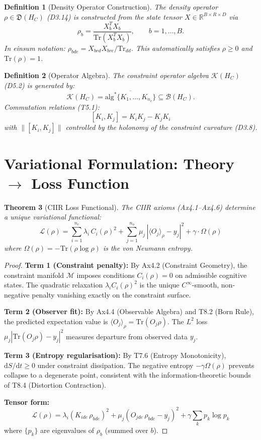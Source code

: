 \documentclass[11pt,a4paper]{article}
\newtheorem{definition}{Definition}[section]
\newtheorem{theorem}[definition]{Theorem}
\newcommand{\CM}{\mathcal{M}}
\newcommand{\HC}{H_C}
\newcommand{\CB}{\mathcal{B}}
\newcommand{\CK}{\mathcal{K}}
\newcommand{\CL}{\mathcal{L}}
\newcommand{\Tr}{\mathrm{Tr}}
\begin{document}
\begin{definition}[Density Operator Construction]
\label{def:density}
The density operator $\rho \in \mathfrak{D}(\HC)$ (D3.14) is
constructed from the state tensor $X \in \mathbb{R}^{B \times R
\times D}$ via
\[
  \rho_b = \frac{X_b^T X_b}{\Tr(X_b^T X_b)},
  \qquad b = 1, \ldots, B.
\]
In einsum notation: $\rho_{bde} = X_{brd} X_{bre} / \Tr_{dd}$.
This automatically satisfies $\rho \geq 0$ and $\Tr(\rho) = 1$.
\end{definition}

\begin{definition}[Operator Algebra]
\label{def:operator-algebra}
The constraint operator algebra $\CK(\HC)$ (D5.2) is generated by:
\[
  \CK(\HC) = \overline{\mathrm{alg}^*\{K_1, \ldots, K_{n_c}\}}
  \subseteq \CB(\HC).
\]
Commutation relations (T5.1):
\[
  [K_i, K_j] = K_i K_j - K_j K_i
\]
with $\|[K_i, K_j]\|$ controlled by the holonomy of the constraint
curvature (D3.8).
\end{definition}

\section{Variational Formulation: Theory $\to$ Loss Function}
\label{sec:loss}

\begin{theorem}[CIIR Loss Functional]
\label{thm:loss}
The CIIR axioms (Ax4.1--Ax4.6) determine a unique variational
functional:
\[
  \CL(\rho) = \sum_{i=1}^{n_c} \lambda_i\, C_i(\rho)^2
    + \sum_{j=1}^{n_o} \mu_j\, |\langle O_j \rangle_\rho - y_j|^2
    + \gamma \cdot \Omega(\rho)
\]
where $\Omega(\rho) = -\Tr(\rho \log \rho)$ is the von Neumann entropy.
\end{theorem}

\begin{proof}
\textbf{Term 1 (Constraint penalty):}
By Ax4.2 (Constraint Geometry), the constraint manifold $\CM$ imposes
conditions $C_i(\rho) = 0$ on admissible cognitive states.  The
quadratic relaxation $\lambda_i C_i(\rho)^2$ is the unique
$C^\infty$-smooth, non-negative penalty vanishing exactly on the
constraint surface.

\textbf{Term 2 (Observer fit):}
By Ax4.4 (Observable Algebra) and T8.2 (Born Rule), the predicted
expectation value is $\langle O_j \rangle_\rho = \Tr(O_j \rho)$.
The $L^2$ loss $\mu_j |\Tr(O_j \rho) - y_j|^2$ measures departure
from observed data $y_j$.

\textbf{Term 3 (Entropy regularisation):}
By T7.6 (Entropy Monotonicity), $\mathrm{d}S/\mathrm{d}t \geq 0$
under constraint dissipation.  The negative entropy $-\gamma
\Omega(\rho)$ prevents collapse to a degenerate point, consistent
with the information-theoretic bounds of T8.4 (Distortion Contraction).

\textbf{Tensor form:}
\[
  \CL(\rho) = \lambda_i (K_{ide}\, \rho_{bde})^2
    + \mu_j (O_{jde}\, \rho_{bde} - y_j)^2
    + \gamma \sum_{k} p_k \log p_k
\]
where $\{p_k\}$ are eigenvalues of $\rho_b$ (summed over $b$).
\end{proof}
\end{document}
